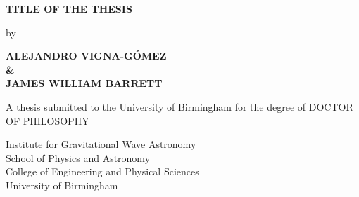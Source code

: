 \begin{titlepage}
    \begin{center}
        \vspace*{2cm}
        \large
        \textbf{TITLE OF THE THESIS}
		
        \vspace{0.5cm}
        by
        \vspace{0.5cm}

        \large
        \textbf{ALEJANDRO VIGNA-G\'OMEZ \\ \& \\ JAMES WILLIAM BARRETT}
		
        \vspace{5cm}

        A thesis submitted to the University of Birmingham for the degree of DOCTOR OF PHILOSOPHY

        \vfill


        \vspace{2cm}

        \end{center}

        \begin{flushright}
        Institute for Gravitational Wave Astronomy \\
		School of Physics and Astronomy \\
		College of Engineering and Physical Sciences \\
        University of Birmingham \\
        \color{red}{Date}
        \end{flushright}
\end{titlepage}
